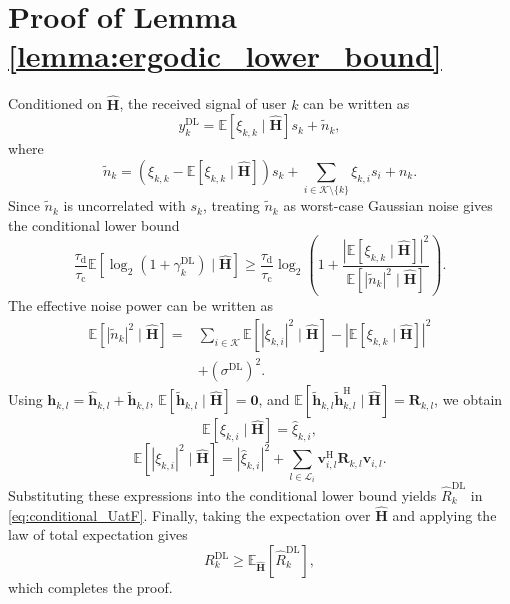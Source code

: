 \documentclass[10pt, conference]{IEEEtran}
\begin{document}
\section{Proof of Lemma \ref{lemma:ergodic_lower_bound}}
\label{appendix:ergodic_lower_bound}
\begin{IEEEproof}
Conditioned on $\hat{\mathbf{H}}$, the received signal of user $k$ can be written as
\begin{equation}
    y_k^{\mathrm{DL}}
    =
    \mathbb{E}\!\left[\xi_{k,k}\mid\hat{\mathbf{H}}\right]s_k
    + \tilde{n}_k,
\end{equation}
where
\begin{equation}
    \tilde{n}_k =
    \left(\xi_{k,k}-\mathbb{E}\!\left[\xi_{k,k}\mid\hat{\mathbf{H}}\right]\right)s_k
    + \sum_{i\in\mathcal{K}\setminus\{k\}}\xi_{k,i}s_i+n_k .
\end{equation}
Since $\tilde{n}_k$ is uncorrelated with $s_k$, treating $\tilde{n}_k$ as worst-case Gaussian noise gives the conditional lower bound
\begin{equation}
\frac{\tau_{\mathrm{d}}}{\tau_{\mathrm{c}}}
\mathbb{E}\!\left[
\log_2(1+\gamma_k^{\mathrm{DL}})
\mid\hat{\mathbf{H}}
\right]
\ge
\frac{\tau_{\mathrm{d}}}{\tau_{\mathrm{c}}}
\log_2\!\left(
1+
\frac{
\left|\mathbb{E}\!\left[\xi_{k,k}\mid\hat{\mathbf{H}}\right]\right|^2
}{
\mathbb{E}\!\left[|\tilde{n}_k|^2\mid\hat{\mathbf{H}}\right]
}
\right).
\end{equation}
The effective noise power can be written as
\begin{equation}
\begin{aligned}
\mathbb{E}\!\left[|\tilde{n}_k|^2\mid\hat{\mathbf{H}}\right]
=&
\sum_{i\in\mathcal{K}}
\mathbb{E}\!\left[|\xi_{k,i}|^2\mid\hat{\mathbf{H}}\right]
-
\left|\mathbb{E}\!\left[\xi_{k,k}\mid\hat{\mathbf{H}}\right]\right|^2 \\
&+
\left(\sigma^{\mathrm{DL}}\right)^2 .
\end{aligned}
\end{equation}
Using $\mathbf{h}_{k,l}=\hat{\mathbf{h}}_{k,l}+\tilde{\mathbf{h}}_{k,l}$,
$\mathbb{E}\left[\tilde{\mathbf{h}}_{k,l}\mid\hat{\mathbf{H}}\right]=\mathbf{0}$, and
$\mathbb{E}\left[\tilde{\mathbf{h}}_{k,l}\tilde{\mathbf{h}}_{k,l}^{\mathrm{H}}\mid\hat{\mathbf{H}}\right]=\mathbf{R}_{k,l}$, we obtain
\begin{equation}
    \mathbb{E}\!\left[\xi_{k,i}\mid\hat{\mathbf{H}}\right]
    =
    \hat{\xi}_{k,i},
\end{equation}
\begin{equation}
    \mathbb{E}\!\left[|\xi_{k,i}|^2\mid\hat{\mathbf{H}}\right]
    =
    |\hat{\xi}_{k,i}|^2
    +
    \sum_{l\in\mathcal{L}_i}
    \mathbf{v}_{i,l}^{\mathrm{H}}\mathbf{R}_{k,l}\mathbf{v}_{i,l}.
\end{equation}
Substituting these expressions into the conditional lower bound yields
$\hat{R}_k^{\mathrm{DL}}$ in \eqref{eq:conditional_UatF}. Finally, taking the expectation over $\hat{\mathbf{H}}$ and applying the law of total expectation gives
\begin{equation}
    R_k^{\mathrm{DL}}
    \ge
    \mathbb{E}_{\hat{\mathbf{H}}}
    \left[\hat{R}_k^{\mathrm{DL}}\right],
\end{equation}
which completes the proof.
\end{IEEEproof}


\end{document}
